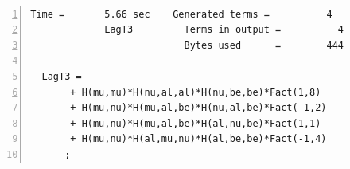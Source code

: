 \documentclass[aspectratio=169,usenames,dvipsnames]{beamer}
\begin{document}
\begin{frame}[t,fragile]{\centering {}\\
    {\centering{}}  } \footnotesize
{}
\vspace{9mm}
\begin{columns}
  \begin{column}{0.125\textwidth}
  \end{column}
  \begin{column}{0.75\textwidth}
\begin{Verbatim}[gobble=2,frame=single,framesep=2mm,label=Result For Triple Graviton Vertex,labelposition=all,numbers=left]
  Time =       5.66 sec    Generated terms =          4
             LagT3         Terms in output =          4
                           Bytes used      =        444
  
  LagT3 =
       + H(mu,mu)*H(nu,al,al)*H(nu,be,be)*Fact(1,8)
       + H(mu,nu)*H(mu,al,be)*H(nu,al,be)*Fact(-1,2)
       + H(mu,nu)*H(mu,al,be)*H(al,nu,be)*Fact(1,1)
       + H(mu,nu)*H(al,mu,nu)*H(al,be,be)*Fact(-1,4)
      ;
\end{Verbatim}
  \end{column}
  \begin{column}{0.125\textwidth}
  \end{column}
\end{columns}

\vspace{100mm}
\end{frame}
\end{document}
